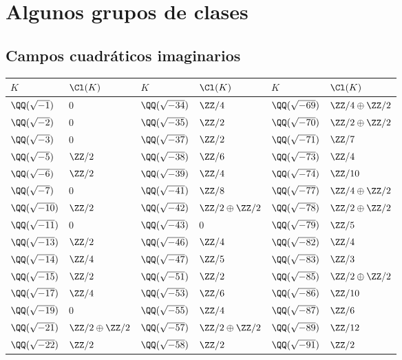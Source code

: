 \chapter{Algunos grupos de clases}


\section{Campos cuadráticos imaginarios}
\label{ap:grupos-de-clases-cuadraticos-imaginarios}

\begin{center}
\renewcommand{\arraystretch}{1.5}
\begin{tabular}{x{2cm}x{2.5cm}x{2cm}x{2.5cm}x{2cm}x{2.5cm}}
\hline
$K$ & $\Cl (K)$ & $K$ & $\Cl (K)$ & $K$ & $\Cl (K)$ \tabularnewline\hline
$\QQ (\sqrt{-1})$ & $0$ & $\QQ (\sqrt{-34})$ & $\ZZ/4$ & $\QQ (\sqrt{-69})$ & $\ZZ/4\oplus\ZZ/2$ \tabularnewline\hline
$\QQ (\sqrt{-2})$ & $0$ & $\QQ (\sqrt{-35})$ & $\ZZ/2$ & $\QQ (\sqrt{-70})$ & $\ZZ/2\oplus\ZZ/2$ \tabularnewline\hline
$\QQ (\sqrt{-3})$ & $0$ & $\QQ (\sqrt{-37})$ & $\ZZ/2$ & $\QQ (\sqrt{-71})$ & $\ZZ/7$ \tabularnewline\hline
$\QQ (\sqrt{-5})$ & $\ZZ/2$ & $\QQ (\sqrt{-38})$ & $\ZZ/6$ & $\QQ (\sqrt{-73})$ & $\ZZ/4$ \tabularnewline\hline
$\QQ (\sqrt{-6})$ & $\ZZ/2$ & $\QQ (\sqrt{-39})$ & $\ZZ/4$ & $\QQ (\sqrt{-74})$ & $\ZZ/10$ \tabularnewline\hline
$\QQ (\sqrt{-7})$ & $0$ & $\QQ (\sqrt{-41})$ & $\ZZ/8$ & $\QQ (\sqrt{-77})$ & $\ZZ/4\oplus\ZZ/2$ \tabularnewline\hline
$\QQ (\sqrt{-10})$ & $\ZZ/2$ & $\QQ (\sqrt{-42})$ & $\ZZ/2\oplus\ZZ/2$ & $\QQ (\sqrt{-78})$ & $\ZZ/2\oplus\ZZ/2$ \tabularnewline\hline
$\QQ (\sqrt{-11})$ & $0$ & $\QQ (\sqrt{-43})$ & $0$ & $\QQ (\sqrt{-79})$ & $\ZZ/5$ \tabularnewline\hline
$\QQ (\sqrt{-13})$ & $\ZZ/2$ & $\QQ (\sqrt{-46})$ & $\ZZ/4$ & $\QQ (\sqrt{-82})$ & $\ZZ/4$ \tabularnewline\hline
$\QQ (\sqrt{-14})$ & $\ZZ/4$ & $\QQ (\sqrt{-47})$ & $\ZZ/5$ & $\QQ (\sqrt{-83})$ & $\ZZ/3$ \tabularnewline\hline
$\QQ (\sqrt{-15})$ & $\ZZ/2$ & $\QQ (\sqrt{-51})$ & $\ZZ/2$ & $\QQ (\sqrt{-85})$ & $\ZZ/2\oplus\ZZ/2$ \tabularnewline\hline
$\QQ (\sqrt{-17})$ & $\ZZ/4$ & $\QQ (\sqrt{-53})$ & $\ZZ/6$ & $\QQ (\sqrt{-86})$ & $\ZZ/10$ \tabularnewline\hline
$\QQ (\sqrt{-19})$ & $0$ & $\QQ (\sqrt{-55})$ & $\ZZ/4$ & $\QQ (\sqrt{-87})$ & $\ZZ/6$ \tabularnewline\hline
$\QQ (\sqrt{-21})$ & $\ZZ/2\oplus\ZZ/2$ & $\QQ (\sqrt{-57})$ & $\ZZ/2\oplus\ZZ/2$ & $\QQ (\sqrt{-89})$ & $\ZZ/12$ \tabularnewline\hline
$\QQ (\sqrt{-22})$ & $\ZZ/2$ & $\QQ (\sqrt{-58})$ & $\ZZ/2$ & $\QQ (\sqrt{-91})$ & $\ZZ/2$ \tabularnewline\hline

\end{tabular}
\end{center}
